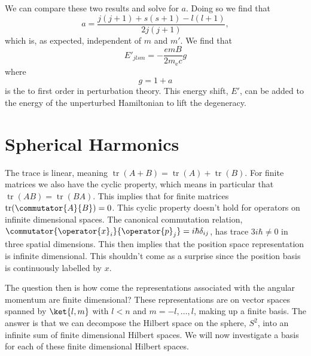 \documentclass[fleqn]{NotesClass}
\DeclareMathOperator{\tr}{tr}
\begin{document}
    We can compare these two results and solve for \(a\).
    Doing so we find that
    \begin{equation}
        a = \frac{j(j + 1) + s(s + 1) - l(l + 1)}{2j(j + 1)},
    \end{equation}
    which is, as expected, independent of \(m\) and \(m'\).
    We find that
    \begin{equation}
        E'_{jlsm} = -\frac{emB}{2m_{\mathrm{e}}c} g
    \end{equation}
    where
    \begin{equation}
        g = 1 + a
    \end{equation}
    is the  to first order in perturbation theory.
    This energy shift, \(E'\), can be added to the energy of the unperturbed Hamiltonian to lift the degeneracy.
    
    \section{Spherical Harmonics}
    The trace is linear, meaning \(\tr(A + B) = \tr(A) + \tr(B)\).
    For finite matrices we also have the cyclic property, which means in particular that \(\tr(AB) = \tr(BA)\).
    This implies that for finite matrices \(\tr(\commutator{A}{B}) = 0\).
    This cyclic property doesn't hold for operators on infinite dimensional spaces.
    The canonical commutation relation, \(\commutator{\operator{x}_i}{\operator{p}_j} = i\hbar \delta_{ij}\), has trace \(3i\hbar \ne 0\) in three spatial dimensions.
    This then implies that the position space representation is infinite dimensional.
    This shouldn't come as a surprise since the position basis is continuously labelled by \(x\).
    
    The question then is how come the representations associated with the angular momentum are finite dimensional?
    These representations are on vector spaces spanned by \(\ket{l, m}\) with \(l < n\) and \(m = -l, \dotsc, l\), making up a finite basis.
    The answer is that we can decompose the Hilbert space on the sphere, \(S^2\), into an infinite sum of finite dimensional Hilbert spaces.
    We will now investigate a basis for each of these finite dimensional Hilbert spaces.
    
\end{document}
